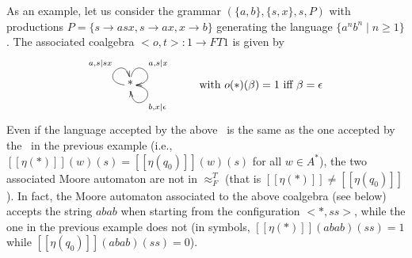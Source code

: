 \documentclass{LMCS}
\newcommand{\bb}[1]{[\![ #1 ]\!]}
\begin{document}
As an example, let us consider the grammar $(\{a,b\},\{s,x\}, s, P)$ with productions
$P = \{ s \to asx, s \to ax, x \to b \}$  generating the language $\{ a^nb^n \mid n \geq 1 \}$.
The associated coalgebra $<o,t>\colon 1 \to FT1$ is given by
\[
\xymatrix{
\mbox{*} \ar@(l,u)^{a,s|sx} \ar@(u,r)^{a,s|x} \ar@(r,d)^-{b,x|\epsilon}
& &
\mbox{with $o(*)(\beta) = 1$ iff $\beta = \epsilon$}
}
\]
Even if the language accepted by the above \pda\, is the same as the one accepted by
the \pda\, in the previous example (i.e., $\bb{\eta(*)}(w)(s) = \bb{\eta(q_0)}(w)(s)$ for all $w\in A^*$), the two associated 
Moore automaton are not in $\approx_F^T$ (that is $\bb{\eta(*)} \neq \bb{\eta(q_0)}$).
In fact, the Moore automaton associated to the above coalgebra (see below) accepts the string 
$abab$ when starting from the configuration $<*,ss>$, while the one in the previous example does not (in symbols, 
$\bb{\eta(*)}(abab)(ss)=1$ while $\bb{\eta(q_0)}(abab)(ss)=0$).
\end{document}

